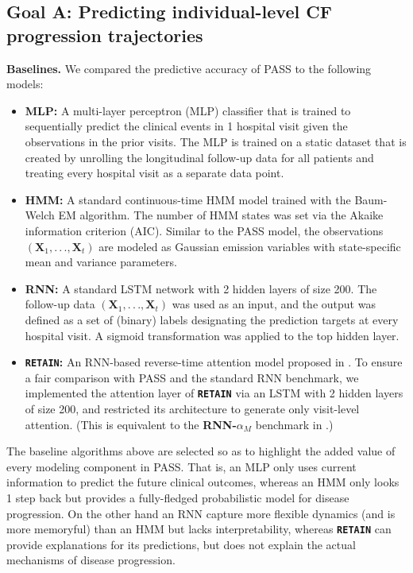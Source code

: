 \documentclass[twoside,11pt]{article}
\begin{document}
\subsection{{\bf Goal A}: Predicting individual-level CF progression trajectories}
\label{SSec51}
{\bf Baselines.} We compared the predictive accuracy of PASS to the following models:
\begin{itemize}
\item {\bf MLP:} A multi-layer perceptron (MLP) classifier that is trained to sequentially predict the clinical events in 1 hospital visit given the observations in the prior visits. The MLP is trained on a static dataset that is created by unrolling the longitudinal follow-up data for all patients and treating every hospital visit as a separate data point.
\item {\bf HMM:} A standard continuous-time HMM model \cite{wang2014unsupervised,liu2015efficient} trained with the Baum-Welch EM algorithm. The number of HMM states was set via the Akaike information criterion (AIC). Similar to the PASS model, the observations \mbox{\footnotesize $(\boldsymbol{X}_{1},.\,.\,.,\boldsymbol{X}_{t})$} are modeled as Gaussian emission variables with state-specific mean and variance parameters.
\item {\bf RNN:} A standard LSTM network with 2 hidden layers of size 200. The follow-up data \mbox{\footnotesize $(\boldsymbol{X}_{1},.\,.\,.,\boldsymbol{X}_{t})$} was used as an input, and the output was defined as a set of (binary) labels designating the prediction targets at every hospital visit. A sigmoid transformation was applied to the top hidden layer. 
\item {\bf {\textbf{\texttt{RETAIN}}}:} An RNN-based reverse-time attention model proposed in \cite{choi2016retain}. To ensure a fair comparison with PASS and the standard RNN benchmark, we implemented the attention layer of {\small \textbf{\texttt{RETAIN}}} via an LSTM with 2 hidden layers of size 200, and restricted its architecture to generate only visit-level attention. (This is equivalent to the {\bf RNN-$\alpha_M$} benchmark in \cite{choi2016retain}.)
\end{itemize}

The baseline algorithms above are selected so as to highlight the added value of every modeling component in PASS. That is, an MLP only uses current information to predict the future clinical outcomes, whereas an HMM only looks 1 step back but provides a fully-fledged probabilistic model for disease progression. On the other hand an RNN capture more flexible dynamics (and is more memoryful) than an HMM but lacks interpretability, whereas {\small {\textbf{\texttt{RETAIN}}}} can provide explanations for its predictions, but does not explain the actual mechanisms of disease progression. 
\end{document}
